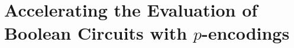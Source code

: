 

%






%
%
%
%
%
%
%
%
%
%



\chapter[Acceleration of Homomorphic Boolean Functions]{Accelerating the Evaluation of Boolean Circuits with $p$-encodings}
\label{chap:p_encodings}












